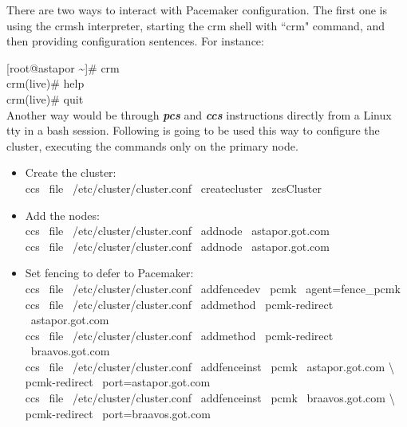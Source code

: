 \documentclass[a4paper, 12pt]{book}
\begin{document}
\noindent There are two ways to interact with Pacemaker configuration. The first one is using the crmsh interpreter, starting the crm shell with ``crm" command, and then providing configuration sentences. For instance:\bigskip

	[root@astapor \textasciitilde]\# crm\\
	\indent crm(live)\# help\\
	\indent crm(live)\# quit\\

\noindent Another way would be through \textit{\textbf{pcs}} and \textit{\textbf{ccs}} instructions directly from a Linux tty in a bash session. Following is going to be used this way to configure the cluster, executing the commands only on the primary node.

\begin{itemize}
	\item Create the cluster:\\
		ccs \ \textminus \textminus file \ /etc/cluster/cluster.conf \ \textminus \textminus createcluster \ zcsCluster
\end{itemize}

\begin{itemize}
	\item Add the nodes:\\
		ccs \ \textminus \textminus file \ /etc/cluster/cluster.conf \ \textminus \textminus addnode \ astapor.got.com\\
		ccs \ \textminus \textminus file \ /etc/cluster/cluster.conf \ \textminus \textminus addnode \ astapor.got.com
\end{itemize}

\begin{itemize}
	\item Set fencing to defer to Pacemaker:\\
		ccs \ \textminus \textminus file \ /etc/cluster/cluster.conf \ \textminus \textminus addfencedev \ pcmk \ agent=fence\_pcmk\\
		ccs \ \textminus \textminus file \ /etc/cluster/cluster.conf \ \textminus \textminus addmethod \ pcmk-redirect \ astapor.got.com\\
		ccs \ \textminus \textminus file \ /etc/cluster/cluster.conf \ \textminus \textminus addmethod \ pcmk-redirect \ braavos.got.com\\
		ccs \ \textminus \textminus file \ /etc/cluster/cluster.conf \ \textminus \textminus addfenceinst \ pcmk \ astapor.got.com \textbackslash \\ pcmk-redirect \ port=astapor.got.com\\
		ccs \ \textminus \textminus file \ /etc/cluster/cluster.conf \ \textminus \textminus addfenceinst \ pcmk \ braavos.got.com \textbackslash \\ pcmk-redirect \ port=braavos.got.com
\end{itemize}
\end{document}
